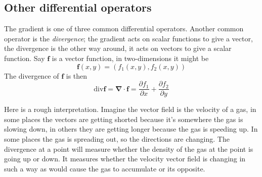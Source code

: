 \documentclass[12pt]{article}
\begin{document}
\subsection*{Other differential operators}
The gradient is one of three common differential operators. Another
common operator is the \textsl{divergence}; the gradient acts on
scalar functions to give a vector, the divergence is the other way
around, it acts on vectors to give a scalar function. Say $\mathbf{f}$
is a vector function, in two-dimensions it might be 
\begin{equation}
\mathbf{f}(x,y)=(f_1(x,y),f_2(x,y))
\end{equation}
The divergence of $\mathbf{f}$ is then
\begin{equation}
\mbox{div}\mathbf{f}=\mathbf{\nabla}\cdot\mathbf{f}=\frac{\partial f_1}{\partial x}+\frac{\partial f_2}{\partial y}
\end{equation}

Here is a rough interpretation. Imagine the vector field is the
velocity of a gas, in some places the vectors are getting shorted
because it's somewhere the gas is slowing down, in others they are
getting longer because the gas is speeding up. In some places the gas
is spreading out, so the directions are changing. The divergence at a
point will measure whether the density of the gas at the point is going up or
down. It measures whether the velocity vector field is changing in such a way as would cause the gas to accumulate or its opposite. 
\end{document}
